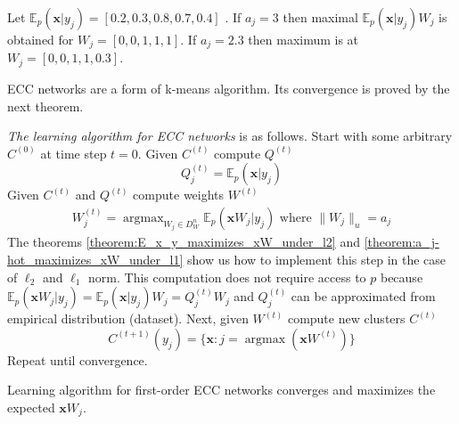 \documentclass[oneside,english,logo]{amuthesis}
\DeclareMathOperator*{\argmax}{argmax}
\begin{document}
\begin{example}
	Let 
	$\mathbb{E}_{p}(\boldsymbol{x}|y_j) = [0.2,0.3,0.8,0.7,0.4]$ . If $a_j=3$ then maximal $\mathbb{E}_{p}(\boldsymbol{x}|y_j)W_j$ is obtained for 
	$W_j=[0,0,1,1,1]$. If $a_j=2.3$ then maximum is at $W_j=[0,0,1,1,0.3]$.
\end{example}
ECC networks are a form of k-means algorithm. Its convergence is proved by the next theorem.
\begin{definition}
	\label{definition:learning_ecc}
\textit{The learning algorithm for ECC networks} is as follows.
Start with some arbitrary $C^{(0)}$ at time step $t=0$. Given $C^{(t)}$ compute $Q^{(t)}$
\[
Q^{(t)}_j = \mathbb{E}_p(\boldsymbol{x}|y_j)
\]
Given $C^{(t)}$ and $Q^{(t)}$ compute weights $W^{(t)}$
\begin{gather*}
	W_j^{(t)} = \argmax_{W_j\in D_W^{n}} \mathbb{E}_p(\boldsymbol{x}W_j|y_j)\text{ where } \lVert W_j \rVert_u=a_j
\end{gather*}
The theorems \ref{theorem:E_x_y_maximizes_xW_under_l2} and \ref{theorem:a_j-hot_maximizes_xW_under_l1} show us how to implement this step in the case of $\ell_2$ and $\ell_1$ norm.
This computation does not require access to $p$ because $\mathbb{E}_{p}(\boldsymbol{x} W_j|y_j) = \mathbb{E}_{p}(\boldsymbol{x}|y_j)W_j = Q^{(t)}_jW_j$ and $Q^{(t)}_j$ can be approximated from empirical distribution (dataset). 
Next, given $W^{(t)}$ compute new clusters $C^{(t)}$
\[
C^{(t+1)}(y_j) = \{\boldsymbol{x} : j=\argmax(\boldsymbol{x}W^{(t)})\}
\]
Repeat until convergence.
\end{definition}
\begin{theorem}
Learning algorithm for first-order ECC networks converges and maximizes the expected $\boldsymbol{x}W_j$.
\end{theorem}
\end{document}
